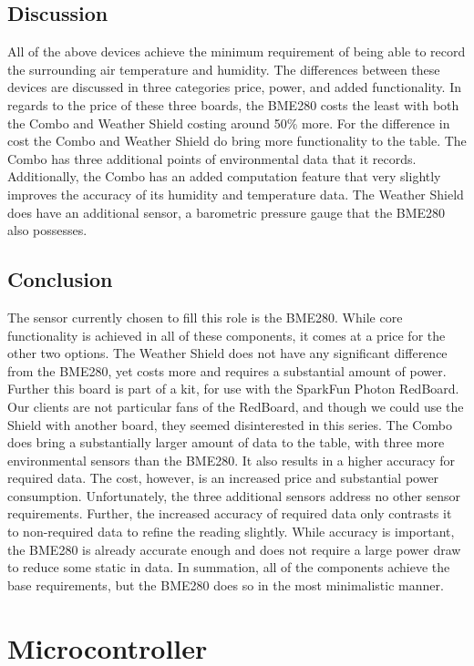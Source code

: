\documentclass[IEEEtran,letterpaper,10pt,titlepage,fleqn,draftclsnofoot,onecolumn]{article}
\begin{document}
\subsection{Discussion}

All of the above devices achieve the minimum requirement of being able to record the surrounding air temperature and humidity. The differences between these devices are discussed in three categories price, power, and added functionality. In regards to the price of these three boards, the BME280 costs the least with both the Combo and Weather Shield costing around 50\% more. For the difference in cost the Combo and Weather Shield do bring more functionality to the table. The Combo has three additional points of environmental data that it records. Additionally, the Combo has an added computation feature that very slightly improves the accuracy of its humidity and temperature data. The Weather Shield does have an additional sensor, a barometric pressure gauge that the BME280 also possesses. 

\subsection{Conclusion}

The sensor currently chosen to fill this role is the BME280. While core functionality is achieved in all of these components, it comes at a price for the other two options. The Weather Shield does not have any significant difference from the BME280, yet costs more and requires a substantial amount of power. Further this board is part of a kit, for use with the SparkFun Photon RedBoard. Our clients are not particular fans of the RedBoard, and though we could use the Shield with another board, they seemed disinterested in this series. The Combo does bring a substantially larger amount of data to the table, with three more environmental sensors than the BME280. It also results in a higher accuracy for required data. The cost, however, is an increased price and substantial power consumption. Unfortunately, the three additional sensors address no other sensor requirements. Further, the increased accuracy of required data only contrasts it to non-required data to refine the reading slightly. While accuracy is important, the BME280 is already accurate enough and does not require a large power draw to reduce some static in data. In summation, all of the components achieve the base requirements, but the BME280 does so in the most minimalistic manner.

\section{Microcontroller}
\end{document}
